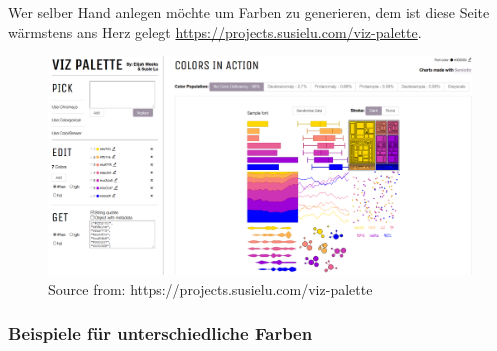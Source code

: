 \documentclass[
]{article}
\begin{document}
Wer selber Hand anlegen möchte um Farben zu generieren, dem ist diese Seite wärmstens ans Herz gelegt \url{https://projects.susielu.com/viz-palette}.

\begin{figure}

{\centering \includegraphics[width=23.28in]{images/064} 

}

\caption{Source from: https://projects.susielu.com/viz-palette}\label{fig:unnamed-chunk-238}
\end{figure}

\hypertarget{beispiele-fuxfcr-unterschiedliche-farben}{%
\subsubsection{Beispiele für unterschiedliche Farben}\label{beispiele-fuxfcr-unterschiedliche-farben}}
\end{document}
